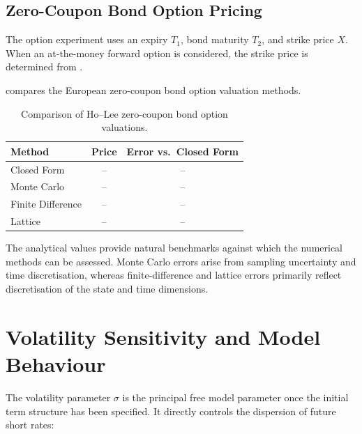 \documentclass[11pt,a4paper]{article}
\numberwithin{equation}{section}
\begin{document}
\subsection{Zero-Coupon Bond Option Pricing}

The option experiment uses an expiry $T_1$, bond maturity $T_2$, and
strike price $X$. When an at-the-money forward option is considered, the
strike price is determined from .

 compares the European zero-coupon bond option
valuation methods.

\begin{table}[H]
    \centering

    \caption{Comparison of Ho--Lee zero-coupon bond option valuations.}
    \label{tab:option_pricing}

    \renewcommand{\arraystretch}{1.2}

    \begin{tabular}{lcc}
        \toprule
        \textbf{Method}
        &
        \textbf{Price}
        &
        \textbf{Error vs.\ Closed Form}
        \\
        \midrule
        Closed Form
        & -- & -- \\
        Monte Carlo
        & -- & -- \\
        Finite Difference
        & -- & -- \\
        Lattice
        & -- & -- \\
        \bottomrule
    \end{tabular}
\end{table}

The analytical values provide natural benchmarks against which the
numerical methods can be assessed. Monte Carlo errors arise from sampling
uncertainty and time discretisation, whereas finite-difference and
lattice errors primarily reflect discretisation of the state and time
dimensions.


\section{Volatility Sensitivity and Model Behaviour}

The volatility parameter $\sigma$ is the principal free model parameter
once the initial term structure has been specified. It directly controls
the dispersion of future short rates:
\end{document}
